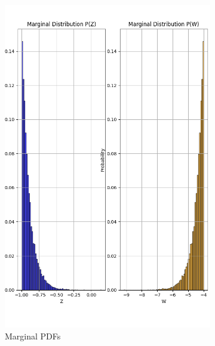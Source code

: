 \documentclass{article}
\begin{document}
\begin{figure}[H]
  \centering
  \begin{subfigure}{0.45\textwidth}
    \centering
    \includegraphics[width=\linewidth]{results/section3/d(1).png}
    \caption{Marginal PDFs}
  \end{subfigure}
  \hfill
  \begin{subfigure}{0.45\textwidth}
    \centering

\end{subfigure}
\end{figure}
\end{document}
